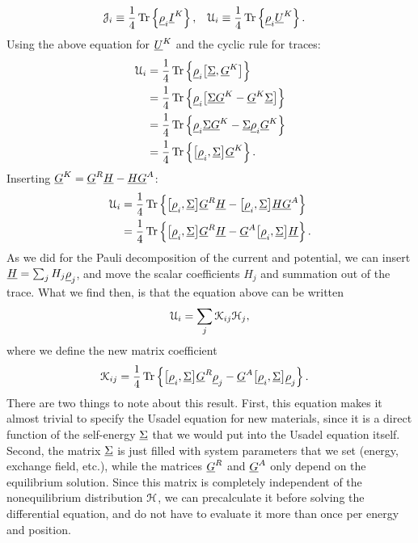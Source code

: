 \begin{align}
  \mathcal{J}_i & \equiv \frac{1}{4} \operatorname{Tr}\left\{ {\underline{\rho}_i} {\underline{I}}^K \right\}, &
  \mathcal{U}_i & \equiv \frac{1}{4} \operatorname{Tr}\left\{ {\underline{\rho}_i} {\underline{U}}^K \right\}.
\end{align}
Using the above equation for ${\underline{U}}^K$ and the cyclic rule for traces:
\begin{align}
  \mathcal{U}_i 
  &= \frac{1}{4} \operatorname{Tr}\left\{ {\underline{\rho}_i} \big[ {\underline{\Sigma}}, {\underline{G}}^K\big] \right\} \\
  &= \frac{1}{4} \operatorname{Tr}\left\{ {\underline{\rho}_i} \big[ {\underline{\Sigma}} {\underline{G}}^K - {\underline{G}}^K {\underline{\Sigma}} \big] \right\} \\
  &= \frac{1}{4} \operatorname{Tr}\left\{ {\underline{\rho}_i} {\underline{\Sigma}} {\underline{G}}^K - {\underline{\Sigma}} {\underline{\rho}_i} {\underline{G}}^K \right\} \\
  &= \frac{1}{4} \operatorname{Tr}\left\{ \big[{\underline{\rho}_i}, {\underline{\Sigma}}\big] {\underline{G}}^K \right\}.
\end{align}
Inserting ${\underline{G}}^K = {\underline{G}}^R {\underline{H}} - {\underline{H}} {\underline{G}}^A$:
\begin{align}
  \mathcal{U}_i 
  &= \frac{1}{4} \operatorname{Tr}\left\{ \big[{\underline{\rho}_i}, {\underline{\Sigma}}\big] {\underline{G}}^R {\underline{H}} - \big[{\underline{\rho}_i}, {\underline{\Sigma}}\big] {\underline{H}} {\underline{G}}^A \right\} \\
  &= \frac{1}{4} \operatorname{Tr}\left\{ \big[{\underline{\rho}_i}, {\underline{\Sigma}}\big] {\underline{G}}^R {\underline{H}} - {\underline{G}}^A \big[{\underline{\rho}_i}, {\underline{\Sigma}}\big] {\underline{H}} \right\}.
\end{align}
As we did for the Pauli decomposition of the current and potential, we can insert $\underline{H} = \sum_j H_j {\underline{\rho}}_j$, and move the scalar coefficients $H_j$ and summation out of the trace.
What we find then, is that the equation above can be written
\begin{align}
  \mathcal{U}_i = \sum_j \mathcal{K}_{ij} \mathcal{H}_j,
\end{align}
where we define the new matrix coefficient
\begin{align}
  \mathcal{K}_{ij}
  &= \frac{1}{4} \operatorname{Tr}\left\{ \big[{\underline{\rho}_i}, {\underline{\Sigma}}\big] {\underline{G}}^R {\underline{\rho}}_j - {\underline{G}}^A \big[{\underline{\rho}_i}, {\underline{\Sigma}}\big] {\underline{\rho}}_j \right\}.
\end{align}
There are two things to note about this result.
First, this equation makes it almost trivial to specify the Usadel equation for new materials, since it is a direct function of the self-energy $\underline{\Sigma}$ that we would put into the Usadel equation itself.
Second, the matrix $\underline{\Sigma}$ is just filled with system parameters that we set (energy, exchange field, etc.), while the matrices ${\underline{G}}^R$ and ${\underline{G}}^A$ only depend on the equilibrium solution.
Since this matrix is completely independent of the nonequilibrium distribution $\mathcal{H}$, we can precalculate it before solving the differential equation, and do not have to evaluate it more than once per energy and position.



